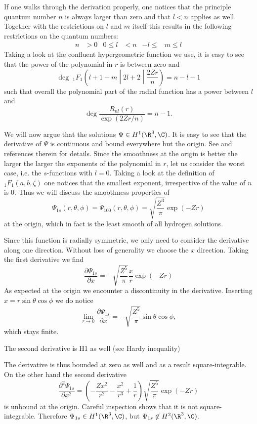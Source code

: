 If one walks through the derivation properly,
one notices that the principle quantum number $n$ is always larger than zero
and that $l < n$ applies as well.
Together with the restrictions on $l$ and $m$ itself this results in the
following restrictions on the quantum numbers:
\begin{align*}
	n &> 0 & 0 \leq l &< n & -l \leq &m \leq l
\end{align*}
Taking a look at the confluent hypergeometric function we use, it is easy to see
that the power of the polynomial in $r$ is between zero and
\[
	\deg \;_1F_1\left(l + 1 -m \middle| 2l+2 \middle| \frac{2Zr}{n} \right) = n - l -1 \]
such that overall the polynomial part of the radial function
has a power between $l$ and
\[ \deg \frac{R_{nl}(r)}{\exp(2Zr/n)} = n - 1. \]

We will now argue that the solutions $\Psi \in H^1(\R^3, \C)$.
It is easy to see that the derivative of $\Psi$ is continuous and bound
everywhere but the origin.
See \cite{Kato1957} and references therein for details.
Since the smoothness at the origin is better the larger
the larger the exponents of the polynomial in $r$,
let us consider the worst case, i.e. the $s$-functions with $l = 0$.
Taking a look at the definition of $_1F_1(a,b,\zeta)$
one notices that the smallest exponent, irrespective of the value of $n$ is $0$.
Thus we will discuss the smoothness properties of
\[
	\Psi_{1s}(r, \theta, \phi) = \Psi_{100}(r, \theta, \phi)
	= \sqrt{\frac{Z^3}{\pi}} \exp(-Z r)
\]
at the origin,
which in fact is the least smooth of all hydrogen solutions.

Since this function is radially symmetric,
we only need to consider the derivative along one direction.
Without loss of generality we choose the $x$ direction.
Taking the first derivative we find
\[
	\frac{\partial \Psi_{1s}}{\partial x} = -\sqrt{\frac{Z^5}{\pi}} \frac{x}{r} \exp(-Z r)
\]
As expected at the origin we encounter a discontinuity in the derivative.
Inserting $x = r \sin\theta \cos \phi$ we do notice
\[
	\lim_{r \to 0} \frac{\partial \Psi_{1s}}{\partial x} = -\sqrt{\frac{Z^5}{\pi}} \sin\theta \cos \phi,
\]
which stays finite.

The second derivative is H1 as well (see Hardy inequality)


The derivative is thus bounded at zero as well
and as a result square-integrable.
On the other hand the second derivative
\[
	\frac{\partial^2 \Psi_{1s}}{\partial x^2}
	= \left( -\frac{Z x^2}{r^2} -\frac{x^2}{r^3} + \frac{1}{r} \right)
		\sqrt{\frac{Z^5}{\pi}} \exp(-Z r)
\]
is unbound at the origin.
Careful inspection shows that it is not square-integrable.
Therefore $\Psi_{1s} \in H^1(\R^3,\C)$, but $\Psi_{1s} \not\in H^2(\R^3, \C)$.







